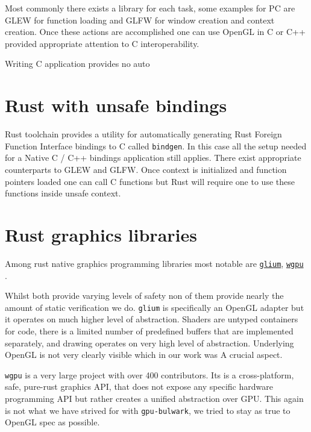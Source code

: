 Most commonly there exists a library for each task, some examples for PC are GLEW for function loading and GLFW for window creation and context creation.
Once these actions are accomplished one can use OpenGL in C or C++ provided appropriate attention to C interoperability.

Writing C application provides no auto

\section{Rust with unsafe bindings}

Rust toolchain provides a utility for automatically generating Rust Foreign Function Interface bindings to C called \texttt{bindgen}.
In this case all the setup needed for a Native C / C++ bindings application still applies. There exist appropriate counterparts to GLEW and GLFW.
Once context is initialized and function pointers loaded one can call C functions but Rust will require one to use these functions inside unsafe context.

\section{Rust graphics libraries}

Among rust native graphics programming libraries most notable are 
\href{https://github.com/glium/glium}{\texttt{glium}}, 
\href{https://github.com/gfx-rs/wgpu}{\texttt{wgpu}} .

Whilst both provide varying levels of safety non of them provide nearly the amount of static verification we do.
\texttt{glium} is specifically an OpenGL adapter but it operates on much higher level of abstraction.
Shaders are untyped containers for code, there is a limited number of predefined buffers that are implemented separately, 
and drawing operates on very high level of abstraction. Underlying OpenGL is not very clearly visible which in our work was A
crucial aspect.

\texttt{wgpu} is a very large project with over 400 contributors. Its is a cross-platform, safe, pure-rust graphics API, that
does not expose any specific hardware programming API but rather creates a unified abstraction over GPU.
This again is not what we have strived for with \texttt{gpu-bulwark}, we tried to stay as true to OpenGL spec as possible.


